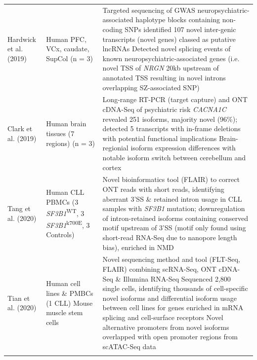 \begin{landscape}
\begin{longtable}[c]{p{4cm}p{4cm}p{18cm}}
		\centering Hardwick et al. (2019) \cite{Hardwick2019a} &
		\centering Human PFC, VCx, \newline caudate, SupCol (n = 3)  &
		\tabitem Targeted sequencing of GWAS neuropsychiatric-associated haplotype blocks containing non-coding SNPs identified 107 novel inter-genic transcripts (novel genes) classed as putative lncRNAs \newline 
		\tabitem Detected novel splicing events of known neuropsychiatric-associated genes (i.e. novel TSS of \textit{NRGN} 20kb upstream of annotated TSS resulting in novel introns overlapping SZ-associated SNP)  \\
		\hdashline[0.5pt/5pt]
		
		\centering Clark et al. (2019) \cite{Clark2019} &
		\centering Human brain tissues \newline (7 regions) (n = 3) &
		\tabitem Long-range RT-PCR (target capture) and ONT cDNA-Seq of psychiatric risk \textit{CACNA1C} revealed 251 isoforms, majority novel (96\%); detected 5 transcripts with in-frame deletions with potential functional implications  \newline 
		\tabitem Brain-regionial isoform expression differences with notable isoform switch between cerebellum and cortex  \\
		
		\centering Tang et al. (2020) \cite{Tang2020} &
		\centering Human CLL PBMCs \newline (3 \textit{SF3B1}\textsuperscript{WT}, 3 \textit{SF3B1}\textsuperscript{k700E}, 3 Controls) &
		\tabitem Novel bioinformatics tool (FLAIR) to correct ONT reads with short reads, identifying aberrant 3'SS \& retained intron usage in CLL samples with \textit{SF3B1} mutation; downregulation of intron-retained isoforms containing conserved motif upstream of 3'SS (motif only found using short-read RNA-Seq due to nanopore length bias), enriched in NMD  \\
		\hdashline[0.5pt/5pt]
		
		\centering Tian et al. (2020) \cite{Tian2020} &
		\centering Human cell lines \& PMBCs (1 CLL) \newline Mouse muscle stem cells &
		\tabitem Novel sequencing method and tool (FLT-Seq, FLAIR) combining scRNA-Seq, ONT cDNA-Seq \& Illumina RNA-Seq \newline 
		\tabitem Sequenced 2,800 single cells, identifying thousands of cell-specific novel isoforms and differential isoform usage between cell lines for genes enriched in mRNA splicing and cell-surface receptors \newline 
		\tabitem Novel alternative promoters from novel isoforms overlapped with open promoter regions from scATAC-Seq data\\
		\hdashline[0.5pt/5pt]
		

\end{longtable}
\end{landscape}
